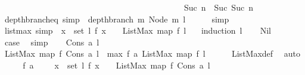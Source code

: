 \begin{isabellebody}
\ \ \ \ \ \ \ \ \ \ \ \ \ \ \ \ \ \ \ \ \ \ \ \ \ \ \ \ \ \ \ \ \ \ \ \ \ \ \ \ \ \ \ \ Suc\ n\ {\isasymRightarrow}\ Suc\ {\isacharparenleft}Suc\ n{\isacharparenright}{\isacharparenright}{\isacharparenright}{\isachardoublequoteclose}\isanewline
\isanewline
{}\isamarkupfalse%
\ depth{\isacharunderscore}branch{\isacharunderscore}eq\ {\isacharbrackleft}simp{\isacharbrackright}\ {\isacharcolon}\ {\isachardoublequoteopen}depth{\isacharunderscore}branch\ m\ {\isacharparenleft}Node\ m\ l{\isacharparenright}\ {\isacharequal}\ {}{\isachardoublequoteclose}\isanewline
%
\isadelimproof
\ \ %
\endisadelimproof
%
\isatagproof
{}\isamarkupfalse%
\ simp%
\endisatagproof
{\isafoldproof}%
%
\isadelimproof
\isanewline
%
\endisadelimproof
\isanewline
{}\isamarkupfalse%
\ listmax{\isacharunderscore}{}\ {\isacharbrackleft}simp{\isacharbrackright}{\isacharcolon}\ {\isachardoublequoteopen}{\isacharparenleft}{\isasymforall}\ x\ {\isasymin}\ set\ l{\isachardot}\ f\ x\ {\isacharequal}\ {}{\isacharparenright}\ {\isasymlongrightarrow}\ ListMax\ {\isacharparenleft}map\ f\ l{\isacharparenright}\ {\isacharequal}\ {}{\isachardoublequoteclose}\isanewline
%
\isadelimproof
%
\endisadelimproof
%
\isatagproof
{}\isamarkupfalse%
\ {\isacharparenleft}induction\ l{\isacharparenright}\isanewline
\ \ \isamarkupfalse%
\ Nil\isanewline
\ \ \isamarkupfalse%
\ \isamarkupfalse%
\ {\isacharquery}case\ \isamarkupfalse%
\ simp\isanewline
{}\isamarkupfalse%
\isanewline
\ \ \isamarkupfalse%
\ {\isacharparenleft}Cons\ a\ l{\isacharparenright}\isanewline
\ \ \isamarkupfalse%
\ {\isachardoublequoteopen}ListMax\ {\isacharparenleft}map\ f\ {\isacharparenleft}Cons\ a\ l{\isacharparenright}{\isacharparenright}\ {\isacharequal}\ max\ {\isacharparenleft}f\ a{\isacharparenright}\ {\isacharparenleft}ListMax\ {\isacharparenleft}map\ f\ l{\isacharparenright}{\isacharparenright}{\isachardoublequoteclose}\isanewline
\ \ \ \ \isamarkupfalse%
\ ListMax{\isacharunderscore}def\ \isamarkupfalse%
\ auto\isanewline
\ \ \isamarkupfalse%
\ \isamarkupfalse%
\ {\isachardoublequoteopen}{\isacharparenleft}f\ a\ {\isacharequal}\ {}{\isacharparenright}\ {\isasymand}\ {\isacharparenleft}{\isasymforall}\ x\ {\isasymin}\ set\ l{\isachardot}\ f\ x\ {\isacharequal}\ {}{\isacharparenright}\ {\isasymlongrightarrow}\ ListMax\ {\isacharparenleft}map\ f\ {\isacharparenleft}Cons\ a\ l{\isacharparenright}{\isacharparenright}\ \ {\isacharequal}\ {}{\isachardoublequoteclose}\isanewline

\end{isabellebody}
